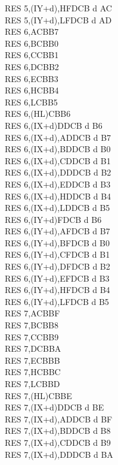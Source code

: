 \documentclass[12pt,twoside,openright,a4paper]{book}
\begin{document}
\begin{multicols}{3}
{\begin{tabbing}
		RES 5,(IY+d),H\UNDOC\>FDCB d AC\\
		RES 5,(IY+d),L\UNDOC\>FDCB d AD\\
		RES 6,A\>CBB7\\
		RES 6,B\>CBB0\\
		RES 6,C\>CBB1\\
		RES 6,D\>CBB2\\
		RES 6,E\>CBB3\\
		RES 6,H\>CBB4\\
		RES 6,L\>CBB5\\
		RES 6,(HL)\>CBB6\\
		RES 6,(IX+d)\>DDCB d B6\\
		RES 6,(IX+d),A\UNDOC\>DDCB d B7\\
		RES 6,(IX+d),B\UNDOC\>DDCB d B0\\
		RES 6,(IX+d),C\UNDOC\>DDCB d B1\\
		RES 6,(IX+d),D\UNDOC\>DDCB d B2\\
		RES 6,(IX+d),E\UNDOC\>DDCB d B3\\
		RES 6,(IX+d),H\UNDOC\>DDCB d B4\\
		RES 6,(IX+d),L\UNDOC\>DDCB d B5\\
		RES 6,(IY+d)\>FDCB d B6\\
		RES 6,(IY+d),A\UNDOC\>FDCB d B7\\
		RES 6,(IY+d),B\UNDOC\>FDCB d B0\\
		RES 6,(IY+d),C\UNDOC\>FDCB d B1\\
		RES 6,(IY+d),D\UNDOC\>FDCB d B2\\
		RES 6,(IY+d),E\UNDOC\>FDCB d B3\\
		RES 6,(IY+d),H\UNDOC\>FDCB d B4\\
		RES 6,(IY+d),L\UNDOC\>FDCB d B5\\
		RES 7,A\>CBBF\\
		RES 7,B\>CBB8\\
		RES 7,C\>CBB9\\
		RES 7,D\>CBBA\\
		RES 7,E\>CBBB\\
		RES 7,H\>CBBC\\
		RES 7,L\>CBBD\\
		RES 7,(HL)\>CBBE\\
		RES 7,(IX+d)\>DDCB d BE\\
		RES 7,(IX+d),A\UNDOC\>DDCB d BF\\
		RES 7,(IX+d),B\UNDOC\>DDCB d B8\\
		RES 7,(IX+d),C\UNDOC\>DDCB d B9\\
		RES 7,(IX+d),D\UNDOC\>DDCB d BA\\

\end{tabbing}}
\end{multicols}
\end{document}
